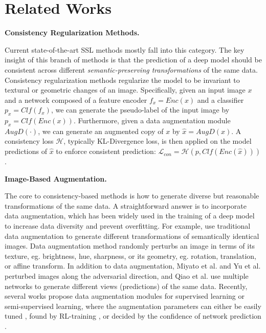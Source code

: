\documentclass[runningheads]{llncs}
\newcommand{\heading}[1]{
\vspace{1mm}\noindent\textbf{#1}
}
\begin{document}
 \section{Related Works}
\heading{Consistency Regularization Methods.}
Current state-of-the-art SSL methods mostly fall into this category.
The key insight of this branch of methods is that the prediction of a deep model should be consistent across different \textit{semantic-preserving transformations} of the same data.
Consistency regularization methods regularize the model to be invariant to textural or geometric changes of an image.
Specifically, given an input image $x$ and a network composed of a feature encoder $f_x = Enc(x)$ and a classifier $p_x = Clf(f_x)$, we can generate the pseudo-label of the input image by $p_x = Clf(Enc(x))$.
Furthermore, given a data augmentation module $AugD(\cdot)$, we can generate an augmented copy of $x$ by $\hat{x} = AugD(x)$.
A consistency loss $\mathcal{H}$, typically KL-Divergence loss, is then applied on the model predictions of $\hat{x}$ to enforce consistent prediction: $\mathcal{L}_{con} = \mathcal{H}(p,Clf(Enc(\hat{x})))$.

\heading{Image-Based Augmentation.}
The core to consistency-based methods is how to generate diverse but reasonable transformations of the same data.
A straightforward answer is to incorporate data augmentation, which has been widely used in the training of a deep model to increase data diversity and prevent overfitting.
For example, \cite{berthelot2019mixmatch,Laine2017iclr,sajjadi2016regularization,tarvainen2017mean} use traditional data augmentation to generate different transformations of semantically identical images.
Data augmentation method randomly perturbs an image in terms of its texture, eg. brightness, hue, sharpness, or its geometry, eg. rotation, translation, or affine transform.
In addition to data augmentation, Miyato et al. \cite{miyato2018virtual} and Yu et al. \cite{yu2019tangent} perturbed images along the adversarial direction, and Qiao et al. \cite{qiao2018deep} use multiple networks to generate different views (predictions) of the same data.
Recently, several works propose data augmentation modules for supervised learning or semi-supervised learning, where the augmentation parameters can either be easily tuned \cite{cubuk2019randaugment}, found by RL-training \cite{cubuk2019autoaugment}, or decided by the confidence of network prediction \cite{berthelot2019remixmatch}.
\end{document}
